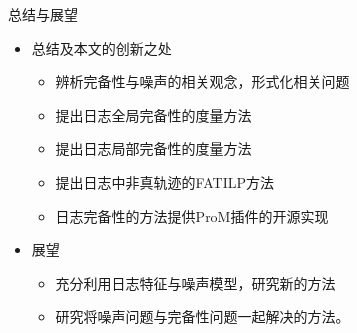 \documentclass[CJK,final,t]{beamer}
\begin{document}
\begin{frame}{}
\begin{columns}[t]
\begin{column}{.3\linewidth}
      \begin{block}{总结与展望}
	\begin{itemize}
		\item 总结及本文的创新之处
			\begin{itemize}
				\item 辨析完备性与噪声的相关观念，形式化相关问题
				\item 提出日志全局完备性的度量方法
				\item 提出日志局部完备性的度量方法
				\item 提出日志中非真轨迹的FATILP方法
				\item 日志完备性的方法提供ProM插件的开源实现
			\end{itemize}
		\item 展望
			\begin{itemize}
				\item 充分利用日志特征与噪声模型，研究新的方法
				\item 研究将噪声问题与完备性问题一起解决的方法。
			\end{itemize}
	\end{itemize}
        \vspace{-1ex}
      \end{block}

    \end{column}
  \end{columns}
\end{frame}
\end{document}
